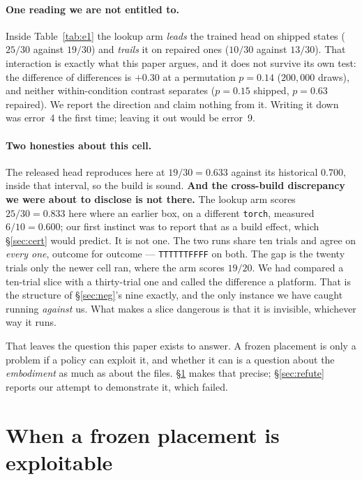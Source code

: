 \documentclass[10pt,twocolumn]{article}
\begin{document}
\paragraph{One reading we are not entitled to.} Inside
Table~\ref{tab:e1} the lookup arm \emph{leads} the trained head on shipped
states ($25/30$ against $19/30$) and \emph{trails} it on repaired ones ($10/30$
against $13/30$). That interaction is exactly what this paper argues, and it
does not survive its own test: the difference of differences is $+0.30$ at a
permutation $p = 0.14$ ($200{,}000$ draws), and neither within-condition
contrast separates ($p = 0.15$ shipped, $p = 0.63$ repaired). We report the
direction and claim nothing from it. Writing it down was error~4 the first
time; leaving it out would be error~9.

\paragraph{Two honesties about this cell.} The released head reproduces here at
$19/30 = 0.633$ against its historical $0.700$, inside that interval, so the
build is sound. \textbf{And the cross-build discrepancy we were about to
disclose is not there.} The lookup arm scores $25/30 = 0.833$ here where an
earlier box, on a different \texttt{torch}, measured $6/10 = 0.600$; our first
instinct was to report that as a build effect, which \S\ref{sec:cert} would
predict. It is not one. The two runs share ten trials and agree on
\emph{every one}, outcome for outcome --- \texttt{TTTTTTFFFF} on both. The gap
is the twenty trials only the newer cell ran, where the arm scores $19/20$. We
had compared a ten-trial slice with a thirty-trial one and called the
difference a platform. That is the structure of \S\ref{sec:neg}'s nine
exactly, and the only instance we have caught running \emph{against} us. What
makes a slice dangerous is that it is invisible, whichever way it runs.

That leaves the question this paper exists to answer. A frozen placement is
only a problem if a policy can exploit it, and whether it can is a question
about the \emph{embodiment} as much as about the files. \S\ref{sec:adm} makes
that precise; \S\ref{sec:refute} reports our attempt to demonstrate it, which
failed.

\section{When a frozen placement is exploitable}
\label{sec:adm}
\end{document}
